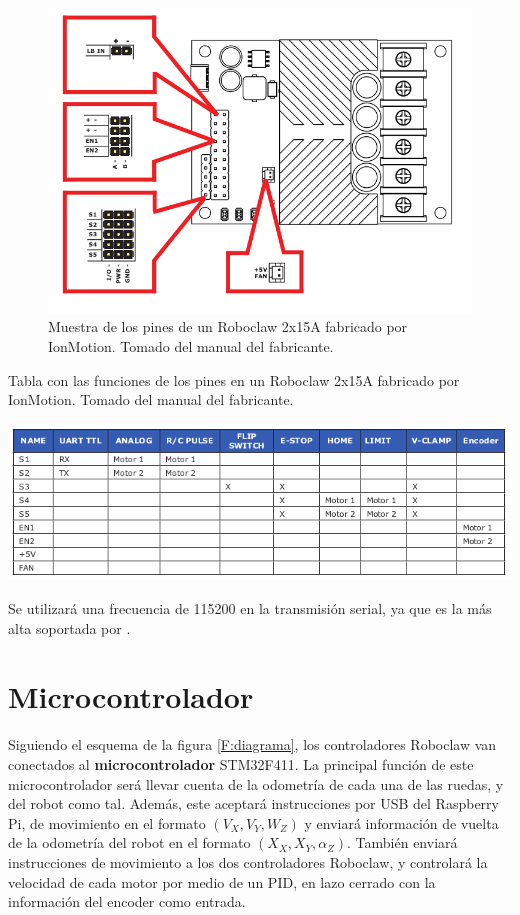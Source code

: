 \begin{figure}[H]
\centering
\includegraphics[scale=0.5]{imagenes/roboclaw.png}
\caption{Muestra de los pines de un Roboclaw 2x15A fabricado por IonMotion. Tomado del manual del fabricante.}
\label{F:roboclaw}
\end{figure}

\begin{table}[H]
\centering
\caption{Tabla con las funciones de los pines en un Roboclaw 2x15A fabricado por IonMotion. Tomado del manual del fabricante.}
\includegraphics[scale=0.7]{imagenes/pines.png}
\label{T:pines}
\end{table}

Se utilizará una frecuencia de 115200 en la transmisión serial, ya que es la más alta soportada por .

\section{Microcontrolador}

Siguiendo el esquema de la figura \ref{F:diagrama}, los controladores Roboclaw van conectados al \textbf{microcontrolador} STM32F411. La principal función de este microcontrolador será llevar cuenta de la odometría de cada una de las ruedas, y del robot como tal. Además, este aceptará instrucciones por USB del Raspberry Pi, de movimiento en el formato $(V_X, V_Y, W_Z)$ y enviará información de vuelta de la odometría del robot en el formato $(X_X, X_Y, \alpha_Z)$. También enviará instrucciones de movimiento a los dos controladores Roboclaw, y controlará la velocidad de cada motor por medio de un PID, en lazo cerrado con la información del encoder como entrada.

